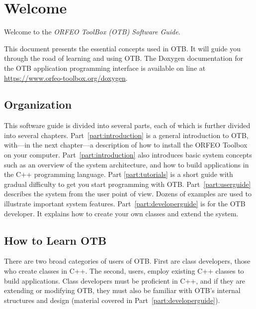 \chapter{Welcome}
\label{chapter:Welcome}

Welcome to the \emph{ORFEO ToolBox (OTB) Software Guide}.

This document presents the essential concepts used in OTB. It will
guide you through the road of learning and using OTB. The Doxygen
documentation for the OTB application programming interface is
available on line at \url{https://www.orfeo-toolbox.org/doxygen}.

\section{Organization}
\label{sec:Organization}

This software guide is divided into several parts, each of which is further
divided into several chapters. Part~\ref{part:introduction} is a general
introduction to OTB,
with---in the next chapter---a description of how to install the ORFEO
Toolbox on your computer. Part~\ref{part:introduction} also
introduces basic system concepts such as an overview of the system
architecture, and how to build applications in the C++ programming
language. Part \ref{part:tutorials} is a short guide with gradual difficulty to
get you start programming with OTB. Part~\ref{part:userguide} describes the
system from the user point of view. Dozens
of examples are used to illustrate important system features.
Part~\ref{part:developerguide}  is for
the OTB developer. It explains how to create your own classes and extend
the system.%

\section{How to Learn OTB}
\label{sec:HowToLearnOTB}

There are two broad categories of users of OTB. First are class
developers, those who create classes in C++. The second, users, employ
existing C++ classes to build applications. Class developers must be
proficient in C++, and if they are extending or modifying OTB, they
must also be familiar with OTB's internal structures and design
(material covered in Part~\ref{part:developerguide}).

